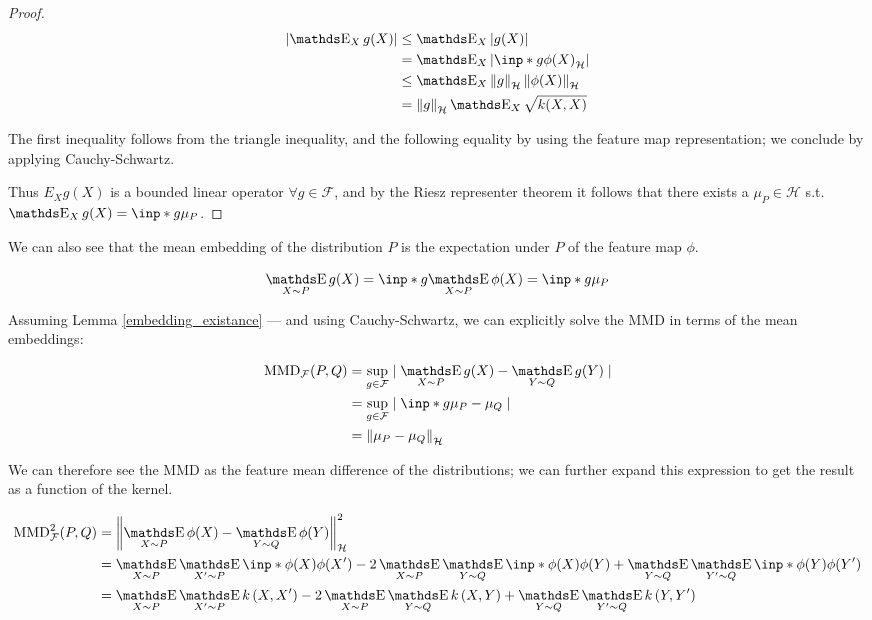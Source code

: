 \begin{proof}
\begin{align*}
    \left|\E_{X} g(X)\right| &\leq 
    \E_{X}|g(X)| \\
    &=
    \E_{X}\left| \inp*{g}{\phi(X)}_{\mathcal{H}}\right| \\
    &\leq
    \E_{X} \norm{g}_{\mathcal{H}} \norm{\phi(X)}_{\mathcal{H}} \\
    &= \norm{g}_{\mathcal{H}} \E_{X} \sqrt{k(X, X)}
\end{align*}

The first inequality follows from the triangle inequality, and the following equality by using 
the feature map representation; we conclude by applying Cauchy-Schwartz.

Thus $E_{X} g(X)$ is a bounded linear operator $\forall g \in \mathcal{F}$, and by the
Riesz representer theorem it follows that there exists a $\mu_P \in \mathcal{H}$
s.t. $\mathop{\E}_{X} g(X) = \inp*{g}{\mu_P}$. 
\end{proof}


We can also see that the mean embedding of the distribution $P$ is the expectation under $P$
of the feature map $\phi$.

$$
    \mathop{\E}_{X \sim P} g(X) = 
     \inp*{g}{ \mathop{\E}_{X \sim P} \phi(X)} = \inp*{g}{\mu_P}
$$

Assuming Lemma \ref{embedding_existance} --- and using Cauchy-Schwartz, 
we can explicitly solve the MMD in terms of the mean embeddings:

\begin{align*} 
    \text{MMD}_\mathcal{F} (P, Q) 
    &= 
    \sup _{g \in \mathcal{F}} \mid \mathop{\E}_{X \sim P} g(X) - \mathop{\E}_{Y \sim Q} g(Y) \mid \\
    &= 
    \sup _{g \in \mathcal{F}} \mid \inp*{g}{\mu_P - \mu_Q} \mid \\
    &=
    \norm{\mu_P - \mu_Q}_\mathcal{H}
\end{align*}

We can therefore see the MMD as the feature mean difference of the distributions; we can further
expand this expression to get the result as a function of the kernel.

\begin{align*}
    \text{MMD}_\mathcal{F}^2 (P, Q)
    &=
    \norm{\mathop{\E}_{X \sim P} \phi(X)  - \mathop{\E}_{Y \sim Q} \phi(Y) }_\mathcal{H}^2 \\
    &= \mathop{\E}_{X \sim P} \mathop{\E}_{X^\prime \sim P} \inp*{\phi(X)}{\phi(X^\prime)} - 
    2 \mathop{\E}_{X \sim P} \mathop{\E}_{Y \sim Q} \inp*{\phi(X)}{\phi(Y)} +
    \mathop{\E}_{Y \sim Q} \mathop{\E}_{Y^\prime \sim Q} \inp*{\phi(Y)}{\phi(Y^\prime)} \\
    &= \mathop{\E}_{X \sim P} \mathop{\E}_{X^\prime \sim P} k \left( X, X^\prime \right) - 
    2 \mathop{\E}_{X \sim P} \mathop{\E}_{Y \sim Q} k \left( X, Y \right) +
    \mathop{\E}_{Y \sim Q} \mathop{\E}_{Y^\prime \sim Q} k \left( Y, Y^\prime \right)
\end{align*}


